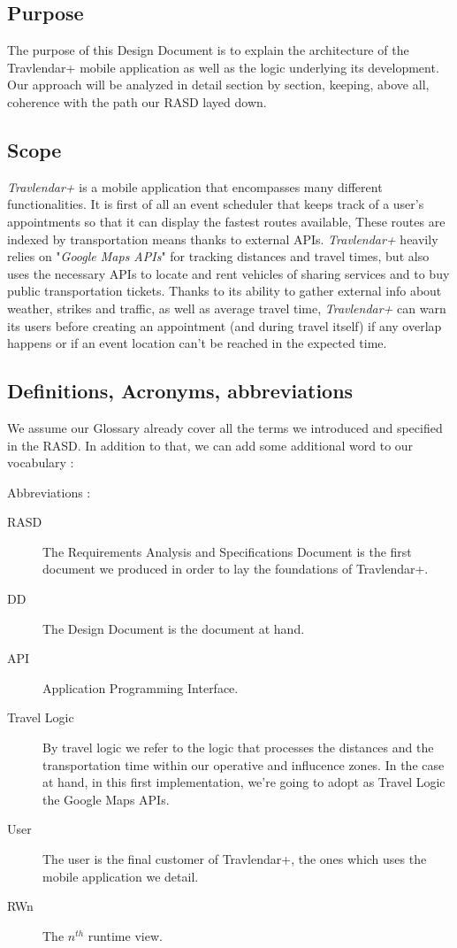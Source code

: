 \subsection{Purpose}
The purpose of this Design Document is to explain the architecture of the Travlendar+ mobile application as well as the logic underlying its development. Our approach will be analyzed in detail section by section, keeping, above all, coherence with the path our RASD layed down.

\subsection{Scope}
\textit{Travlendar+} is a mobile application that encompasses many different functionalities. 
It is first of all an event scheduler that keeps track of a user’s appointments so that it can display the fastest routes available, These routes are indexed by transportation means thanks to external APIs.
\textit{Travlendar+} heavily relies on "\textit{Google Maps APIs}" for tracking distances and travel times, but also uses the necessary APIs to locate and rent vehicles of sharing services and to buy public transportation tickets. Thanks to its ability to gather external info about weather, strikes and traffic, as well as average travel time, \textit{Travlendar+} can warn its users before creating an appointment (and during travel itself) if any overlap happens or if an event location can’t be reached in the expected time.

\subsection{Definitions, Acronyms, abbreviations}
We assume our Glossary already cover all the terms we introduced and specified in the RASD. In addition to that, we can add some additional word to our vocabulary :

Abbreviations :
\begin{description}
	\item[RASD] The Requirements Analysis and Specifications Document is the first document we produced in order to lay the foundations of Travlendar+.
	\item[DD] The Design Document is the document at hand.
	\item[API] Application Programming Interface.
	\item[Travel Logic] By travel logic we refer to the logic that processes the distances and the transportation time within our operative and influcence zones. In the case at hand, in this first implementation, we're going to adopt as Travel Logic the Google Maps APIs.
	\item[User]  The user is the final customer of Travlendar+, the ones which uses the mobile application we detail.
	\item [RWn] The $n^{th}$ runtime view.
\end{description}

